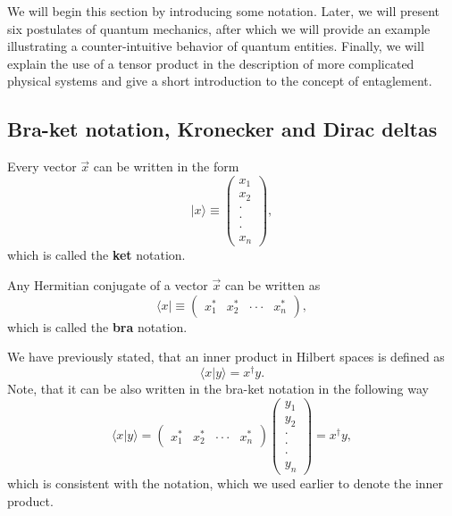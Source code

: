 We will begin this section by introducing some notation. Later, we will present six postulates of quantum mechanics, after which we will provide an example illustrating a counter-intuitive behavior of quantum entities. Finally, we will explain the use of a tensor product in the description of more complicated physical systems and give a short introduction to the concept of entaglement.

\subsection{Bra-ket notation, Kronecker and Dirac deltas}

\begin{definition}
Every vector $\vec{x}$ can be written in the form
\[ | x \rangle \equiv \begin{pmatrix} x_1 \\ x_2 \\ \cdot \\ \cdot \\ \cdot \\ x_n \end{pmatrix}, \]
which is called the \textbf{ket} notation.
\end{definition}

\begin{definition}
Any Hermitian conjugate of a vector $\vec{x}$ can be written as
\[ \langle x | \equiv \begin{pmatrix} x_1^* & x_2^* & \cdot \cdot \cdot & x_n^* \end{pmatrix}, \]
which is called the \textbf{bra} notation.
\end{definition}

\begin{remark}
We have previously stated, that an inner product in Hilbert spaces is defined as
\[ \langle x | y \rangle = x^\dagger y.\]
Note, that it can be also written in the bra-ket notation in the following way
\[ \langle x | y \rangle = \begin{pmatrix} x_1^* & x_2^* & \cdot \cdot \cdot & x_n^* \end{pmatrix} \begin{pmatrix} y_1 \\ y_2 \\ \cdot \\ \cdot \\ \cdot \\ y_n \end{pmatrix} = x^\dagger y,\]
which is consistent with the notation, which we used earlier to denote the inner product.
\end{remark}



